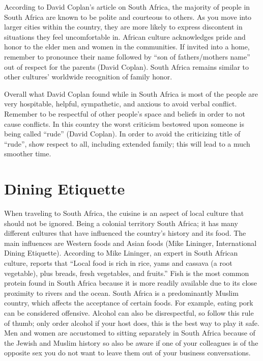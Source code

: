 \documentclass[11pt,a4paper,twoside]{report}
\begin{document}
According to David Coplan’s article on South Africa, the majority of people in
South Africa are known to be polite and courteous to others. As you move into
larger cities within the country, they are more likely to express discontent in
situations they feel uncomfortable in. African culture acknowledges pride and
honor to the elder men and women in the communities. If invited into a home,
remember to pronounce their name followed by “son of fathers/mothers name” out
of respect for the parents (David Coplan). South Africa remains similar to
other cultures’ worldwide recognition of family honor.


Overall what David Coplan found while in South Africa is most of the people are
very hospitable, helpful, sympathetic, and anxious to avoid verbal conflict.
Remember to be respectful of other people’s space and beliefs in order to not
cause conflicts. In this country the worst criticism bestowed upon someone is
being called “rude” (David Coplan).  In order to avoid the criticizing title of
“rude”, show respect to all, including extended family; this will lead to a
much smoother time.

\section{Dining Etiquette}

When traveling to South Africa, the cuisine is an aspect of local culture that
should not be ignored. Being a colonial territory South Africa; it has many
different cultures that have influenced the country’s history and its food. The
main influences are Western foods and Asian foods (Mike Lininger, International
Dining Etiquette).  According to Mike Lininger, an expert in South African
culture, reports that “Local food is rich in rice, yams and cassava (a root
vegetable), plus breads, fresh vegetables, and fruits.” Fish is the most common
protein found in South Africa because it is more readily available due to its
close proximity to rivers and the ocean. South Africa is a predominantly Muslim
country, which affects the acceptance of certain foods. For example, eating
pork can be considered offensive.  Alcohol can also be disrespectful, so follow
this rule of thumb; only order alcohol if your host does, this is the best way
to play it safe. Men and women are accustomed to sitting separately in South
Africa because of the Jewish and Muslim history so also be aware if one of your
colleagues is of the opposite sex you do not want to leave them out of your
business conversations.
\end{document}
